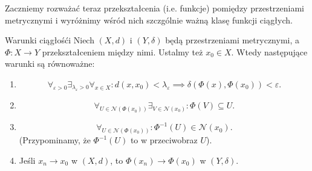 \documentclass{article}
\numberwithin{defi}{section}
\numberwithin{defi}{section}
\newcommand{\Nau}{\mathcal{N}}
\providecommand{\eps}{\varepsilon}
\begin{document}
Zaczniemy rozważać teraz przekształcenia (i.e. funkcje) pomiędzy przestrzeniami metrycznymi i wyróżnimy wśród nich szczgólnie ważną klasę funkcji ciągłych.

\begin{twier}{Warunki ciągłośći} \label{twier:warunki-ciaglosci}
    Niech $(X, d)$ i $(Y, \delta)$ będą przestrzeniami metrycznymi, a $\Phi : X \to Y$ przekształceniem między nimi. Ustalmy też $x_0 \in X$. Wtedy następujące warunki są równoważne:
    \begin{enumerate}
        \item \begin{equation}
                  \forall_{\eps > 0} \exists_{\lambda_\eps >0} \forall_{x \in X}: d(x, x_0) < \lambda_\eps \implies \delta(\Phi(x), \Phi(x_0)) < \eps.
              \end{equation}
        \item \begin{equation}
                  \forall_{U \in \Nau(\Phi(x_0))} \exists_{V \in \Nau(x_0)}: \Phi(V) \subseteq U.
              \end{equation}
        \item \begin{equation}
                  \forall_{U \in \Nau(\Phi(x_0))}: \Phi^{-1}(U) \in \Nau(x_0).
              \end{equation} (Przypominamy, że $\Phi^{-1}(U)$ to w przeciwobraz $U$).
        \item Jeśli $x_n \to x_0$ w $(X, d)$, to $\Phi(x_n) \to \Phi(x_0)$ w $(Y, \delta)$.
    \end{enumerate}
\end{twier}
\end{document}
